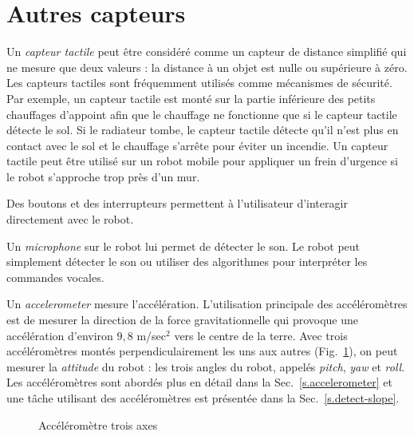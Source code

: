 \section{Autres capteurs}\label{s.other-sensors}

Un \emph{capteur tactile} peut être considéré comme un capteur de distance simplifié qui ne mesure que deux valeurs : la distance à un objet est nulle ou supérieure à zéro. Les capteurs tactiles sont fréquemment utilisés comme mécanismes de sécurité. Par exemple, un capteur tactile est monté sur la partie inférieure des petits chauffages d'appoint afin que le chauffage ne fonctionne que si le capteur tactile détecte le sol. Si le radiateur tombe, le capteur tactile détecte qu'il n'est plus en contact avec le sol et le chauffage s'arrête pour éviter un incendie. Un capteur tactile peut être utilisé sur un robot mobile pour appliquer un frein d'urgence si le robot s'approche trop près d'un mur.

Des boutons et des interrupteurs permettent à l'utilisateur d'interagir directement avec le robot.

Un \emph{microphone} sur le robot lui permet de détecter le son. Le robot peut simplement détecter le son ou utiliser des algorithmes pour interpréter les commandes vocales.

Un \emph{accelerometer} mesure l'accélération. L'utilisation principale des accéléromètres est de mesurer la direction de la force gravitationnelle qui provoque une accélération d'environ $9,8$ m/sec$^{2}$ vers le centre de la terre. Avec trois accéléromètres montés perpendiculairement les uns aux autres (Fig.~\ref{fig.accel}), on peut mesurer la \emph{attitude} du robot : les trois angles du robot, appelés \emph{pitch}, \emph{yaw} et \emph{roll}. Les accéléromètres sont abordés plus en détail dans la Sec.~\ref{s.accelerometer} et une tâche utilisant des accéléromètres est présentée dans la Sec.~\ref{s.detect-slope}.

\begin{figure}
\begin{center}
\caption{Accéléromètre trois axes}\label{fig.accel}
\end{center}
\end{figure}

